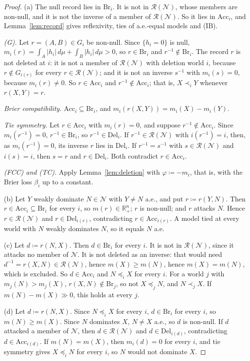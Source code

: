 \documentclass[11pt]{article}
\newcommand{\R}{\mathbb{R}}
\newcommand{\NN}{\mathcal{N}}
\newcommand{\RR}{\mathcal{R}}
\newcommand{\Br}{\mathrm{Br}}
\newcommand{\Acc}{\mathrm{Acc}}
\newcommand{\Del}{\mathrm{Del}}
\newcommand{\Rp}{\R^n_{+}}
\theoremstyle{plain}
\theoremstyle{definition}
\theoremstyle{remark}
\begin{document}
\begin{proof}
(a) The null record lies in $\Br_i$. It is not in $\RR(\NN)$, whose members are
non-null, and it is not the inverse of a member of $\RR(\NN)$. So it lies in $\Acc_i$,
and Lemma~\ref{lem:record} gives reflexivity, ties of a.e.-equal models and (IB).

\emph{(G).} Let $r=(A,B)\in G_i$ be non-null. Since $\{h_i=0\}$ is null,
$m_i(r)=\int_A|h_i|\,d\mu+\int_B|h_i|\,d\mu>0$, so $r\in\Br_i$ and $r^{-1}\notin\Br_i$.
The record $r$ is not deleted at $i$: it is not a member of $\RR(\NN)$ with deletion
world $i$, because $r\notin G_{i(r)}$ for every $r\in\RR(\NN)$; and it is not an inverse
$s^{-1}$ with $m_i(s)=0$, because $m_i(r)\ne0$. So $r\in\Acc_i$ and $r^{-1}\notin
\Acc_i$; that is, $X\prec_iY$ whenever $r(X,Y)=r$.

\emph{Brier compatibility.} $\Acc_i\subseteq\Br_i$, and $m_i(r(X,Y))=m_i(X)-m_i(Y)$.

\emph{Tie symmetry.} Let $r\in\Acc_i$ with $m_i(r)=0$, and suppose $r^{-1}\notin
\Acc_i$. Since $m_i(r^{-1})=0$, $r^{-1}\in\Br_i$, so $r^{-1}\in\Del_i$. If $r^{-1}\in
\RR(\NN)$ with $i(r^{-1})=i$, then, as $m_i(r^{-1})=0$, its inverse $r$ lies in $\Del_i$.
If $r^{-1}=s^{-1}$ with $s\in\RR(\NN)$ and $i(s)=i$, then $s=r$ and $r\in\Del_i$. Both
contradict $r\in\Acc_i$.

\emph{(FCC) and (TC).} Apply Lemma~\ref{lem:deletion} with $\varphi\coloneqq-m_i$, that
is, with the Brier loss $\beta_i$ up to a constant.

(b) Let $Y$ weakly dominate $N\in\NN$ with $Y\ne N$ a.e., and put $r\coloneqq r(Y,N)$.
Then $r\in\Acc_i\subseteq\Br_i$ for every $i$, so $m(r)\in\Rp$; $r$ is non-null; and $r$
attacks $N$. Hence $r\in\RR(\NN)$ and $r\in\Del_{i(r)}$, contradicting $r\in
\Acc_{i(r)}$. A model tied at every world with $N$ weakly dominates $N$, so it equals $N$
a.e.

(c) Let $d\coloneqq r(N,X)$. Then $d\in\Br_i$ for every $i$. It is not in $\RR(\NN)$,
since it attacks no member of $\NN$. It is not deleted as an inverse: that would need
$d^{-1}=r(X,N)\in\RR(\NN)$, hence $m(X)\ge m(N)$, hence $m(X)=m(N)$, which is excluded. So
$d\in\Acc_i$ and $N\preceq_iX$ for every $i$. For a world $j$ with $m_j(N)>m_j(X)$,
$r(X,N)\notin\Br_j$, so not $X\preceq_jN$, and $N\prec_jX$. If $m(N)-m(X)\gg0$, this
holds at every $j$.

(d) Let $d\coloneqq r(N,X)$. Since $N\preceq_iX$ for every $i$, $d\in\Br_i$ for every
$i$, so $m(N)\ge m(X)$. Since $N$ dominates $X$, $N\ne X$ a.e., so $d$ is non-null. If $d$
attacked a member of $\NN$, then $d\in\RR(\NN)$ and $d\in\Del_{i(d)}$, contradicting
$d\in\Acc_{i(d)}$. If $m(N)=m(X)$, then $m_i(d)=0$ for every $i$, and tie symmetry gives
$X\preceq_iN$ for every $i$, so $N$ would not dominate $X$.


\end{proof}
\end{document}
